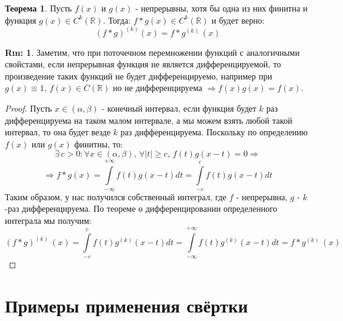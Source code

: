 \documentclass[12pt]{article}
\newcommand{\MR}{\mathbb{R}}
\theoremstyle{definition}
\newtheorem{rem}{Rm:}
\newtheorem{theorem}{Теорема}
\newcommand{\ddint}[2]{\displaystyle\int\limits_{#1}^{#2}}
\begin{document}
\begin{theorem}
	Пусть $f(x)$ и $g(x)$ - непрерывны, хотя бы одна из них финитна и функция $g(x) \in C^k(\MR)$. Тогда: $f*g(x) \in C^k(\MR)$ и будет верно:
	$$
		(f*g)^{(k)}(x) = f*g^{(k)}\,(x)
	$$
\end{theorem}
\begin{rem}
	Заметим, что при поточечном перемножении функций с аналогичными свойстами, если непрерывная функция не является дифференцируемой, то произведение таких функций не будет дифференцируемо, например при $g(x) \equiv 1$, $f(x) \in C(\MR)$ но не дифференцируема $\Rightarrow f(x)g(x) = f(x)$.
\end{rem}
\begin{proof}
	Пусть $x \in (\alpha, \beta)$ - конечный интервал, если функция будет $k$ раз дифференцируема на таком малом интервале, а мы можем взять любой такой интервал, то она будет везде $k$ раз дифференцируема. Поскольку по определению $f(x)$ или $g(x)$ финитны, то: 
	$$
		\exists \, c > 0 \colon \forall x \in (\alpha,\beta), \, \forall |t| \geq c, \, f(t)g(x - t) = 0 \Rightarrow
	$$
	$$
		\Rightarrow f*g(x) = \ddint{-\infty}{+\infty}f(t)g(x-t)dt = \ddint{-c}{c}f(t)g(x - t)dt
	$$
	Таким образом, у нас получился собственный интеграл, где $f$ - непрерывна, $g$ - $k$-раз дифференцируема. По теореме о дифференцировании определенного интеграла мы получим:
	$$
		(f*g)^{(k)}\,(x) = \ddint{-c}{c}f(t)g^{(k)}(x-t)dt = \ddint{-\infty}{+\infty}f(t)g^{(k)}(x-t)dt = f*g^{(k)}\,(x)
	$$
\end{proof}

\newpage
\section*{Примеры применения свёртки}
\end{document}
